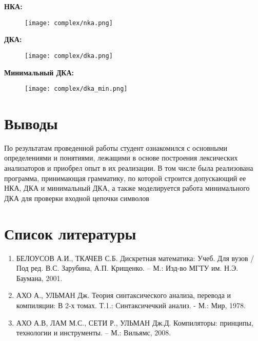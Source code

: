 		\newpage
		\textbf{НКА:}
			\begin{figure}[h!]
				\begin{center}
					\texttt{[image: complex/nka.png]}
				\end{center}
			\end{figure}

		\newpage
		\textbf{ДКА:}
			\begin{figure}[h!]
				\begin{center}
					\texttt{[image: complex/dka.png]}
				\end{center}
			\end{figure}

		\textbf{Минимальный ДКА:}
			\begin{figure}[h!]
				\begin{center}
					\texttt{[image: complex/dka\_min.png]}
				\end{center}
			\end{figure}


	\newpage
	\section{Выводы}
	
	По результатам проведенной работы студент ознакомился с основными определениями и понятиями, лежащими в основе
		построения лексических анализаторов и приобрел опыт в их реализации.
	В том числе была реализована программа, принимающая грамматику, по которой строится допускающий ее НКА, ДКА и минимальный ДКА, 
		а также моделируется работа минимального ДКА для проверки входной цепочки символов


	\section{Список литературы}
		\begin{enumerate}
			\item БЕЛОУСОВ А.И., ТКАЧЕВ С.Б. Дискретная математика: Учеб. Для вузов / Под ред. В.С. Зарубина, А.П. Крищенко. – М.: Изд-во МГТУ им. Н.Э. Баумана, 2001.
			\item АХО А., УЛЬМАН Дж. Теория синтаксического анализа, перевода и компиляции: В 2-х томах. Т.1.: Синтаксичечкий анализ. - М.: Мир, 1978.
			\item АХО А.В, ЛАМ М.С., СЕТИ Р., УЛЬМАН Дж.Д. Компиляторы: принципы, технологии и инструменты. – М.: Вильямс, 2008.
		\end{enumerate}
	